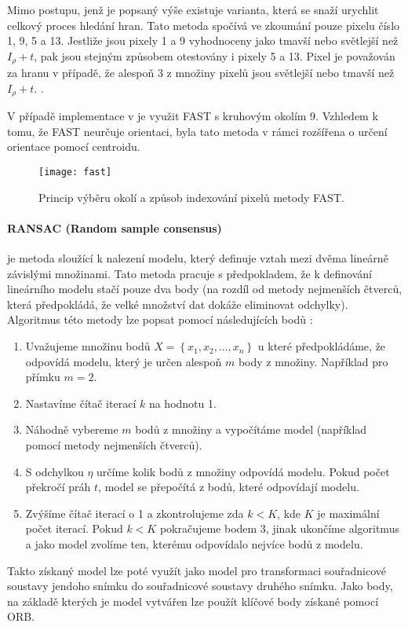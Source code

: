 Mimo postupu, jenž je popsaný výše existuje varianta, která se snaží urychlit  celkový proces hledání hran. Tato metoda spočívá ve zkoumání pouze pixelu číslo 1, 9, 5 a 13. Jestliže jsou pixely 1 a 9 vyhodnoceny jako tmavší nebo světlejší než $I_\rho + t$, pak jsou stejným způsobem otestovány i pixely 5 a 13. Pixel je považován za hranu v případě, že alespoň 3 z množiny pixelů jsou světlejší nebo tmavší než $I_\rho + t$. \cite{rosten_2008_faster}.

V případě implementace v  je využit FAST s kruhovým okolím 9. Vzhledem k tomu, že FAST neurčuje orientaci, byla tato metoda v rámci  rozšířena o určení orientace pomocí centroidu. \cite{orb}

\begin{figure}[htb]
\centering
\texttt{[image: fast]}
\caption{Princip výběru okolí a způsob indexování pixelů metody FAST. \cite{rosten_2008_faster}}
\label{fig:orb-comparsion}
\end{figure}

\paragraph{RANSAC (Random sample consensus)} je metoda sloužící k nalezení modelu, který definuje vztah mezi dvěma lineárně závislými množinami. Tato metoda pracuje s předpokladem, že k definování lineárního modelu stačí pouze dva body (na rozdíl od metody nejmenších čtverců, která předpokládá, že velké množství dat dokáže eliminovat odchylky). Algoritmus této metody lze popsat pomocí následujících bodů \cite[str.~462]{Image-Processing-Analysis-and-Machine-Vision}:
\begin{enumerate}
\item Uvažujeme množinu bodů $X = \left\{x_1, x_2, ..., x_n \right\}$ u které předpokládáme, že odpovídá modelu, který je určen alespoň $m$ body z množiny. Například pro přímku $m = 2$.
\item Nastavíme čítač iterací $k$ na hodnotu 1.
\item Náhodně vybereme $m$ bodů z množiny a vypočítáme model (například pomocí metody nejmenších čtverců).
\item S odchylkou $\eta$ určíme kolik bodů z množiny odpovídá modelu. Pokud počet překročí práh $t$, model se přepočítá z bodů, které odpovídají modelu.
\item Zvýšíme čítač iterací o 1 a zkontrolujeme zda $k < K$, kde $K$ je maximální počet iterací. Pokud $k < K$ pokračujeme bodem 3, jinak ukončíme algoritmus a jako model zvolíme ten, kterému odpovídalo nejvíce bodů z modelu.
\end{enumerate}
Takto získaný model lze poté využít jako model pro transformaci souřadnicové soustavy jendoho snímku do souřadnicové soustavy druhého snímku. Jako body, na základě kterých je model vytvářen lze použít klíčové body získané pomocí ORB. 

